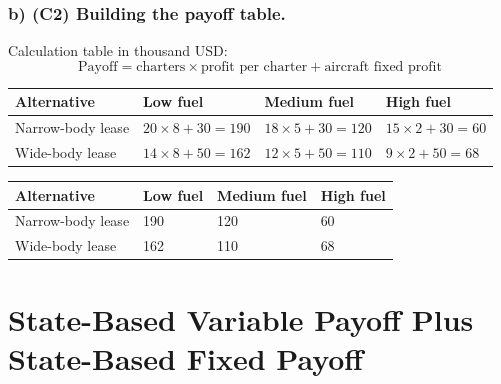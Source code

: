 	
	\subsubsection*{b) \textbf{(C2)} Building the payoff table.}
	\label{subsec:problem13-air-cargo-charters-c2}
	Calculation table in thousand USD:
	\[
	\text{Payoff}=\text{charters}\times\text{profit per charter}+\text{aircraft fixed profit}
	\]
	\begin{center}
		\begin{tabular}{llll}
			\toprule
			Alternative & Low fuel & Medium fuel & High fuel \\
			\midrule
			Narrow-body lease & $20 \times 8 + 30 = 190$ & $18 \times 5 + 30 = 120$ & $15 \times 2 + 30 = 60$ \\
			Wide-body lease & $14 \times 8 + 50 = 162$ & $12 \times 5 + 50 = 110$ & $9 \times 2 + 50 = 68$ \\
			\bottomrule
		\end{tabular}
	\end{center}
	
	\begin{center}
		\begin{tabular}{llll}
			\toprule
			Alternative & Low fuel & Medium fuel & High fuel \\
			\midrule
			Narrow-body lease & 190 & 120 & 60 \\
			Wide-body lease & 162 & 110 & 68 \\
			\bottomrule
		\end{tabular}
	\end{center}
	
	
	\section{State-Based Variable Payoff Plus State-Based Fixed Payoff}
	\label{sec:state-based-variable-payoff-plus-state-based-fixed-payoff}
	
	
